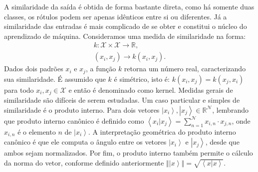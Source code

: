 A similaridade da saída é obtida de forma bastante direta, como há somente duas classes, os rótulos podem ser apenas idênticos entre si ou diferentes. Já a similaridade das entradas é mais complicado de se obter e constitui o núcleo do aprendizado de máquina. Consideramos  uma medida de similaridade na forma:
\begin{equation}
\begin{split}
k:\mathcal{X}\times\mathcal{X}\rightarrow\mathbb{R}, \\
\left(x_i,x_j\right)\rightarrow k\left(x_i,x_j\right).
\end{split} 
\end{equation}
Dados dois padrões $x_i$ e $x_j$,  a função $k$ retorna um número real, caracterizando sua similaridade.  É assumido que $k$ é simétrico, isto é: $k\left(x_i,x_j \right)=k\left(x_j,x_i\right)$ para todo $x_i,x_j\in\mathcal{X}$ e  então é denominado como kernel. Medidas gerais de similaridade são difíceis de serem estudadas. Um caso particular e  simples de similaridade é o produto interno. Para dois vetores $\left|x_{i}\right\rangle ,\left|x_{j}\right\rangle \in\mathbb{R}^{\mathcal{N}}$, lembrando que produto interno canônico é definido como $\left\langle x_{i}|x_{j}\right\rangle =\sum_{n=1}^{\mathcal{N}}x_{i,n}\cdot x_{j,n}$, onde $x_{i,n}$ é o elemento $n$ de $\left|x_{i}\right\rangle $. A interpretação geométrica do produto interno canônico é que ele computa o ângulo entre os vetores $\left|x_{i}\right\rangle $ e $\left|x_{j}\right\rangle $, desde que ambos sejam normalizados. Por fim, o  produto interno também permite o cálculo da norma do vetor, conforme definido anteriormente $\left\Vert \left|x\right\rangle \right\Vert =\sqrt{\left\langle x|x\right\rangle }$.


